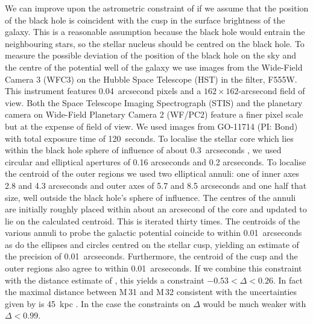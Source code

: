 \documentclass[useAMS,usenatbib]{mn2e}
\begin{document}
We can improve upon the astrometric constraint of
\citet{2015arXiv150203231Y} if we assume that the position of the
black hole is coincident with the cusp in the surface brightness of
the galaxy.  This is a reasonable assumption because the black hole
would entrain the neighbouring stars, so the stellar nucleus should be
centred on the black hole. To measure the possible deviation of the
position of the black hole on the sky and the centre of the potential
well of the galaxy we use images from the Wide-Field Camera 3 (WFC3)
on the Hubble Space Telescope (HST) in the filter, F555W.  This
instrument features 0.04~arcsecond pixels and a $162 \times
162$-arcsecond field of view.  Both the Space Telescope Imaging
Spectrograph (STIS) and the planetary camera on Wide-Field Planetary
Camera 2 (WF/PC2) feature a finer pixel scale but at the expense of
field of view.  We used images from GO-11714 (PI: Bond) with total
exposure time of 120~seconds.  To localise the stellar core which lies
within the black hole sphere of influence of about 0.3~arcseconds
\citep{2001ApJ...550..668J}, we used circular and elliptical apertures
of 0.16 arcseconds and 0.2 arcseconds.  To localise the centroid of
the outer regions we used two elliptical annuli: one of inner axes 2.8
and 4.3 arcseconds and outer axes of 5.7 and 8.5 arcseconds and one
half that size, well outside the black hole's sphere of influence.
The centres of the annuli are initially roughly placed within about an
arcsecond of the core and updated to lie on the calculated
centroid. This is iterated thirty times.  The centroids of the various
annuli to probe the galactic potential coincide to within
0.01~arcseconds as do the ellipses and circles centred on the stellar
cusp, yielding an estimate of the precision of 0.01~arcseconds.
Furthermore, the centroid of the cusp and the outer regions also agree
to within 0.01~arcseconds.  If we combine this constraint with the
distance estimate of \citet{2006AJ....131.1405K}, this yields a
constraint $-0.53<\Delta<0.26$.  In fact the maximal distance between
M\,31 and M\,32 consistent with the uncertainties given by
\cite{2006AJ....131.1405K} is 45~kpc \citep[see also][for an
  alternative interpretation]{2014ApJ...788L..38D}.  In the case the
constraints on $\Delta$ would be much weaker with $\Delta<0.99$.
\end{document}
